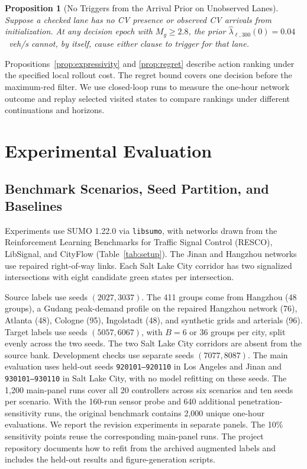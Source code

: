 \documentclass[letterpaper,journal]{IEEEtran}
\newtheorem{proposition}{Proposition}
\begin{document}
\begin{proposition}[No Triggers from the Arrival Prior on Unobserved Lanes]
\label{prop:maxred}
Suppose a checked lane has no CV presence or observed CV arrivals from initialization. At any decision epoch with $M_g\ge2.8$, the prior $\hat\lambda_{\ell,300}(0)=0.04$~veh/s cannot, by itself, cause either clause to trigger for that lane.
\end{proposition}

Propositions~\ref{prop:expressivity} and \ref{prop:regret} describe action ranking under the specified local rollout cost. The regret bound covers one decision before the maximum-red filter. We use closed-loop runs to measure the one-hour network outcome and replay selected visited states to compare rankings under different continuations and horizons.

\section{Experimental Evaluation}
\label{sec:experiments}

\subsection{Benchmark Scenarios, Seed Partition, and Baselines}
Experiments use SUMO 1.22.0 via \texttt{libsumo}, with networks drawn from the Reinforcement Learning Benchmarks for Traffic Signal Control (RESCO), LibSignal, and CityFlow \cite{ault2021reinforcement,mei2022libsignal,zhang2019cityflow} (Table~\ref{tab:setup}). The Jinan and Hangzhou networks use repaired right-of-way links. Each Salt Lake City corridor has two signalized intersections with eight candidate green states per intersection.

Source labels use seeds $(2027,3037)$. The 411 groups come from Hangzhou (48 groups), a Gudang peak-demand profile on the repaired Hangzhou network (76), Atlanta (48), Cologne (95), Ingolstadt (48), and synthetic grids and arterials (96). Target labels use seeds $(5057,6067)$, with $B=6$ or $36$ groups per city, split evenly across the two seeds. The two Salt Lake City corridors are absent from the source bank. Development checks use separate seeds $(7077,8087)$. The main evaluation uses held-out seeds \texttt{920101--920110} in Los Angeles and Jinan and \texttt{930101--930110} in Salt Lake City, with no model refitting on these seeds. The 1,200 main-panel runs cover all 20 controllers across six scenarios and ten seeds per scenario. With the 160-run sensor probe and 640 additional penetration-sensitivity runs, the original benchmark contains 2,000 unique one-hour evaluations. We report the revision experiments in separate panels. The 10\% sensitivity points reuse the corresponding main-panel runs. The project repository documents how to refit from the archived augmented labels and includes the held-out results and figure-generation scripts.
\end{document}
